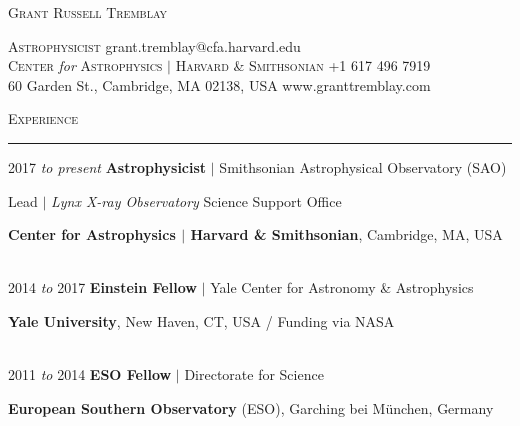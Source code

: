 \documentclass[11pt]{article}
\makeatletter
\def\vhrulefill#1{\leavevmode\leaders\hrule\@height#1\hfill \kern\z@}
\makeatother
\begin{document}
\thispagestyle{empty}

\begin{center}
\hspace*{0.5in}
{\Large \textsc{Grant Russell Tremblay}}\\
\end{center}
{\small
\hspace*{6mm}\textsc{Astrophysicist} \hfill grant.tremblay@cfa.harvard.edu\\
\hspace*{6mm}\textsc{Center} \textit{for} \textsc{Astrophysics $|$ Harvard \& Smithsonian}  \hfill +1 617 496 7919\\
\hspace*{6mm}60 Garden St., Cambridge, MA 02138, USA \hfill www.granttremblay.com\\}



\textsc{Experience} \vhrulefill{0.4pt}


\vspace{2mm}


\hspace{2.5mm} 2017 \textit{to present} \hspace{13.5mm} \textbf{Astrophysicist} $|$ Smithsonian Astrophysical Observatory (SAO)


\hspace{42mm} \parbox{5.15in}{Lead $|$ \textit{Lynx X-ray Observatory} Science Support Office}

\hspace{42mm} \parbox{5.15in}{ \textbf{Center for Astrophysics $|$ Harvard \& Smithsonian}, Cambridge, MA, USA}\\


\hspace{2.5mm} 2014 \textit{to} 2017 \hspace{17mm} \textbf{Einstein Fellow}
$|$ Yale Center for Astronomy \& Astrophysics

\hspace{42mm} \parbox{5.15in}{\textbf{Yale University}, New Haven, CT, USA / Funding via NASA}\\



\hspace{2.5mm} 2011 \textit{to} 2014 \hspace{17mm} \textbf{ESO Fellow} $|$ Directorate for Science

\hspace{42mm} \parbox{5.15in}{\textbf{European Southern Observatory} (ESO), Garching bei M\"{u}nchen, Germany}\\
\end{document}
